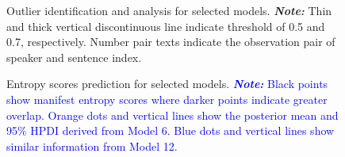 \documentclass[
  authoryear,
  preprint,
  1p]{elsarticle}
\begin{document}
\label{cell-fig-rq1-model-outliers}
\begin{figure}[H]


\caption{\label{fig-rq1-model-outliers}Outlier identification and
analysis for selected models. \textbf{\emph{Note:}} Thin and thick
vertical discontinuous line indicate threshold of 0.5 and 0.7,
respectively. Number pair texts indicate the observation pair of speaker
and sentence index.}

\end{figure}%

\label{cell-fig-rq3-pred-speaker}
\begin{figure}[H]


\caption{\label{fig-rq3-pred-speaker}Entropy scores prediction for
selected models. \textcolor{blue}{\textbf{\emph{Note:}} Black points show manifest
entropy scores where darker points indicate greater overlap. Orange dots
and vertical lines show the posterior mean and 95\% HPDI derived from
Model 6. Blue dots and vertical lines show similar information from
Model 12.}}

\end{figure}%
\end{document}
